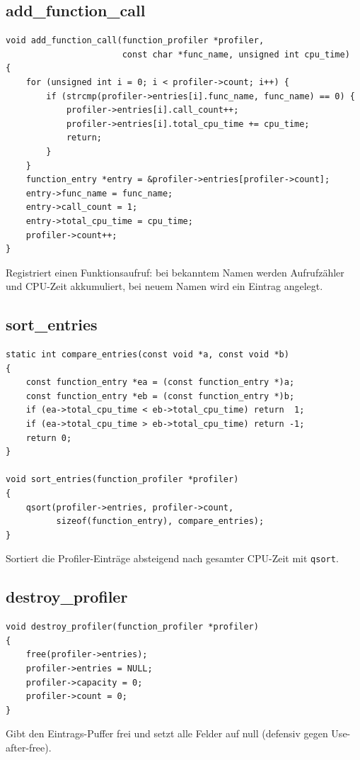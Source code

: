 \documentclass[10pt, a4paper]{article}
\begin{document}
\subsection{add\_function\_call}
\begin{lstlisting}
void add_function_call(function_profiler *profiler,
                       const char *func_name, unsigned int cpu_time)
{
    for (unsigned int i = 0; i < profiler->count; i++) {
        if (strcmp(profiler->entries[i].func_name, func_name) == 0) {
            profiler->entries[i].call_count++;
            profiler->entries[i].total_cpu_time += cpu_time;
            return;
        }
    }
    function_entry *entry = &profiler->entries[profiler->count];
    entry->func_name = func_name;
    entry->call_count = 1;
    entry->total_cpu_time = cpu_time;
    profiler->count++;
}
\end{lstlisting}
Registriert einen Funktionsaufruf: bei bekanntem Namen werden Aufrufz\"ahler und CPU-Zeit akkumuliert, bei neuem Namen wird ein Eintrag angelegt.

\subsection{sort\_entries}
\begin{lstlisting}
static int compare_entries(const void *a, const void *b)
{
    const function_entry *ea = (const function_entry *)a;
    const function_entry *eb = (const function_entry *)b;
    if (ea->total_cpu_time < eb->total_cpu_time) return  1;
    if (ea->total_cpu_time > eb->total_cpu_time) return -1;
    return 0;
}

void sort_entries(function_profiler *profiler)
{
    qsort(profiler->entries, profiler->count,
          sizeof(function_entry), compare_entries);
}
\end{lstlisting}
Sortiert die Profiler-Eintr\"age absteigend nach gesamter CPU-Zeit mit \texttt{qsort}.

\subsection{destroy\_profiler}
\begin{lstlisting}
void destroy_profiler(function_profiler *profiler)
{
    free(profiler->entries);
    profiler->entries = NULL;
    profiler->capacity = 0;
    profiler->count = 0;
}
\end{lstlisting}
Gibt den Eintrags-Puffer frei und setzt alle Felder auf null (defensiv gegen Use-after-free).
\end{document}
